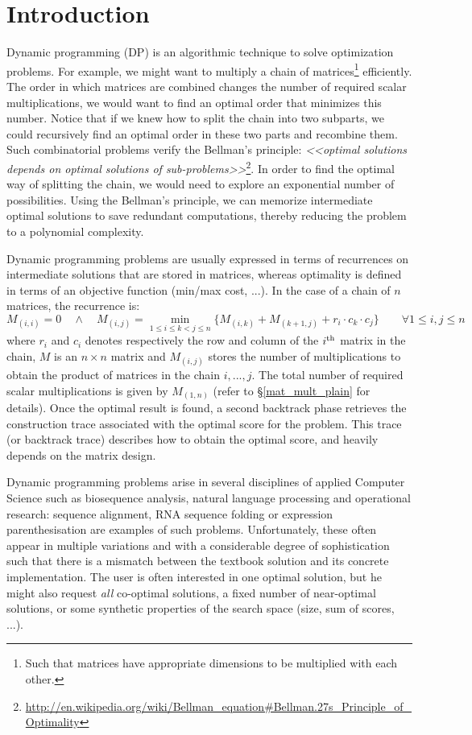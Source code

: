 \newpage
\setcounter{tocdepth}{2} \tableofcontents
\newpage
\section{Introduction} \label{intro}
Dynamic programming (DP) is an algorithmic technique to solve optimization problems. For example, we might want to multiply a chain of matrices\footnote{Such that matrices have appropriate dimensions to be multiplied with each other.} efficiently. The order in which matrices are combined changes the number of required scalar multiplications, we would want to find an optimal order that minimizes this number. Notice that if we knew how to split the chain into two subparts, we could recursively find an optimal order in these two parts and recombine them. Such combinatorial problems verify the Bellman's principle\cite{bellman_principle}: \textit{<<optimal solutions depends on optimal solutions of sub-problems>>}\footnote{\url{http://en.wikipedia.org/wiki/Bellman\_equation\#Bellman.27s\_Principle\_of\_Optimality}}. In order to find the optimal way of splitting the chain, we would need to explore an exponential number of possibilities. Using the Bellman's principle, we can memorize intermediate optimal solutions to save redundant computations, thereby reducing the problem to a polynomial complexity.

Dynamic programming problems are usually expressed in terms of recurrences on intermediate solutions that are stored in matrices, whereas optimality is defined in terms of an objective function (min/max cost, ...). In the case of a chain of $n$ matrices, the recurrence is:
	\[M_{(i,i)}=0 \quad\land\quad M_{(i,j)}=\min_{1\le i\le k<j\le n}\{M_{(i,k)}+M_{(k+1,j)}+r_i \cdot c_k \cdot c_j\} \qquad \forall 1\le i,j\le n\]
where $r_i$ and $c_i$ denotes respectively the row and column of the $i^{\rm th}$ matrix in the chain, $M$ is an $n \times n$ matrix and $M_{(i,j)}$ stores the number of multiplications to obtain the product of matrices in the chain $i,...,j$. The total number of required scalar multiplications is given by $M_{(1,n)}$ (refer to \S\ref{mat_mult_plain} for details). Once the optimal result is found, a second backtrack phase retrieves the construction trace associated with the optimal score for the problem. This trace (or backtrack trace) describes how to obtain the optimal score, and heavily depends on the matrix design.

Dynamic programming problems arise in several disciplines of applied Computer Science such as biosequence analysis, natural language processing and operational research: sequence alignment, RNA sequence folding or expression parenthesisation are examples of such problems. Unfortunately, these often appear in multiple variations and with a considerable degree of sophistication such that there is a mismatch between the textbook solution and its concrete implementation. The user is often interested in one optimal solution, but he might also request \textit{all} co-optimal solutions, a fixed number of near-optimal solutions, or some synthetic properties of the search space (size, sum of scores, ...).


